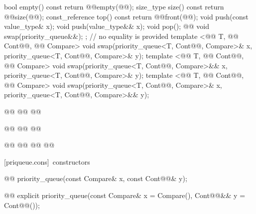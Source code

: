 \documentclass[american,twoside]{book}
\begin{document}
\begin{codeblock}
{{    bool      empty() const       { return @@empty(@@); }
    size_type size()  const       { return @@size(@@); }
    const_reference   top() const { return @@front(@@); }
    void push(const value_type& x);
    void push(value_type&& x);
    void pop();
    @@
      void swap(priority_queue&&);
  };
                // no equality is provided
  template <@@ T, @@ Cont@@, @@ Compare>
    void swap(priority_queue<T, Cont@@, Compare>& x, priority_queue<T, Cont@@, Compare>& y);
  template <@@ T, @@ Cont@@, @@ Compare>
    void swap(priority_queue<T, Cont@@, Compare>&& x, priority_queue<T, Cont@@, Compare>& y);
  template <@@ T, @@ Cont@@, @@ Compare>
    void swap(priority_queue<T, Cont@@, Compare>& x, priority_queue<T, Cont@@, Compare>&& y);

  @@
    @@
    @@

  @@
    @@
      @@

  @@
    @@
      @@
      @@
}
\end{codeblock}

[priqueue.cons]{\ constructors}

%
\begin{itemdecl}
@@ priority_queue(const Compare& x, const Cont@@& y);

@@ 
explicit priority_queue(const Compare& x = Compare(), Cont@@&& y = Cont@@());
\end{itemdecl}
\end{document}
